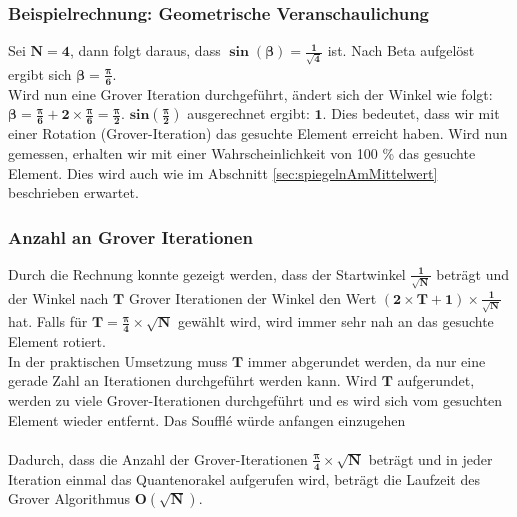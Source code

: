 \subsubsection{Beispielrechnung: Geometrische Veranschaulichung}
Sei $\mathbf{N=4}$, dann folgt daraus, dass $\mathbf{\sin(\beta) = \frac{1}{\sqrt{4}}}$ ist. Nach Beta aufgelöst ergibt sich $\mathbf{\beta = \frac{\pi}{6}}$.
\\
Wird nun eine Grover Iteration durchgeführt, ändert sich der Winkel wie folgt: $\mathbf{\beta = \frac{\pi}{6} + 2 \times \frac{\pi}{6}  = \frac{\pi}{2}}$. $\mathbf{sin(\frac{\pi}{2})}$ ausgerechnet ergibt: $\mathbf{1}$. Dies bedeutet, dass wir mit einer Rotation (Grover-Iteration) das gesuchte Element erreicht haben. Wird nun gemessen, erhalten wir mit einer Wahrscheinlichkeit von 100 \% das gesuchte Element. Dies wird auch wie im Abschnitt  \ref{sec:spiegelnAmMittelwert}  beschrieben erwartet.

\subsubsection{Anzahl an Grover Iterationen}
Durch die Rechnung konnte gezeigt werden, dass der Startwinkel $\mathbf{\frac{1}{\sqrt{N}}}$ beträgt und der Winkel nach $\mathbf{T}$ Grover Iterationen der Winkel den Wert $\mathbf{(2 \times T + 1)\times \frac{1}{\sqrt{N}}}$ hat. 
Falls für $\mathbf{T = \frac{\pi}{4}\times \sqrt{N}}$ gewählt wird, wird immer sehr nah an das gesuchte Element rotiert. 
\\
In der praktischen Umsetzung muss $\mathbf{T}$ immer abgerundet werden, da nur eine gerade Zahl an Iterationen durchgeführt werden kann. Wird $\mathbf{T}$ aufgerundet, werden zu viele Grover-Iterationen durchgeführt und es wird sich vom gesuchten Element wieder entfernt. \cite[S. 157]{Kaye.2007} Das Souffl\'{e} würde anfangen einzugehen
\\
\\
Dadurch, dass die Anzahl der Grover-Iterationen $\mathbf{ \frac{\pi}{4}\times \sqrt{N}}$ beträgt und in jeder Iteration einmal das Quantenorakel aufgerufen wird, beträgt die Laufzeit des Grover Algorithmus $\mathbf{O(\sqrt N)}$.


